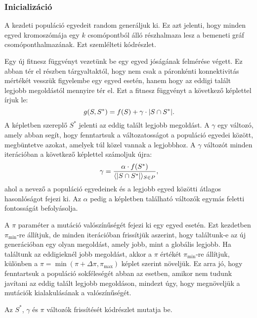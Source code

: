 \subsubsection{Inicializáció}
A kezdeti populáció egyedeit random generáljuk ki.
Ez azt jelenti, hogy minden egyed kromoszómája egy $k$ csomópontból álló részhalmaza lesz a bemeneti gráf csomóponthalmazának.
Ezt szemlélteti  kódrészlet.


Egy új fitnesz függvényt vezetünk be egy egyed jóságának felmérése végett.
Ez abban tér el  részben tárgyaltaktól,
hogy nem csak a páronkénti konnektivitás mértékét vesszük figyelembe egy egyed esetén,
hanem hogy az eddigi talált legjobb megoldástól mennyire tér el.
Ezt a fitnesz függvényt a következő képlettel írjuk le:
\begin{equation}\label{eqn:SOCNDP_GA_FITNESZ_FUNCTION}
  g(S, S^{*}) = f(S) + \gamma \cdot \lvert S \cap S^{*}\rvert.
\end{equation}
A képletben szereplő $S^{*}$ jelenti az eddig talált legjobb megoldást.
A $\gamma$ egy változó, amely abban segít, hogy fenntartsuk a változatosságot a populáció egyedei között,
megbüntetve azokat, amelyek túl közel vannak a legjobbhoz.
A $\gamma$ változót minden iterációban a következő képlettel számoljuk újra:
\begin{equation}\label{eqn:SOCNDP_GA_GAMMA}
  \gamma = \frac{\alpha \cdot f(S^{*})}{\langle \lvert S \cap S^{*}\rvert \rangle_{S \in P}},
\end{equation}
ahol a nevező a populáció egyedeinek és a legjobb egyed közötti átlagos hasonlóságot fejezi ki.
Az $\alpha$ pedig a képletben található változók egymás feletti fontosságát befolyásolja.

A $\pi$ paraméter a mutáció valószínűségét fejezi ki egy egyed esetén.
Ezt kezdetben $\pi_{\min}$-re állítjuk, de minden iterációban frissítjük aszerint,
hogy találtunk-e az új generációban egy olyan megoldást, amely jobb, mint a globális legjobb.
Ha találtunk az eddigieknél jobb megoldást, akkor a $\pi$ értékét $\pi_{\min}$-re állítjuk,
különben a $\pi = \min \left(\pi + \Delta \pi, \pi_{\max} \right)$ képlet szerint növeljük.
Ez arra jó, hogy fenntartsuk a populáció sokféleségét abban az esetben,
amikor nem tudunk javítani az eddig talált legjobb megoldáson,
mindezt úgy, hogy megnöveljük a mutációk kialakulásának a valószínűségét.

Az $S^{*}$, $\gamma$ és $\pi$ változók frissítését  kódrészlet mutatja be.



